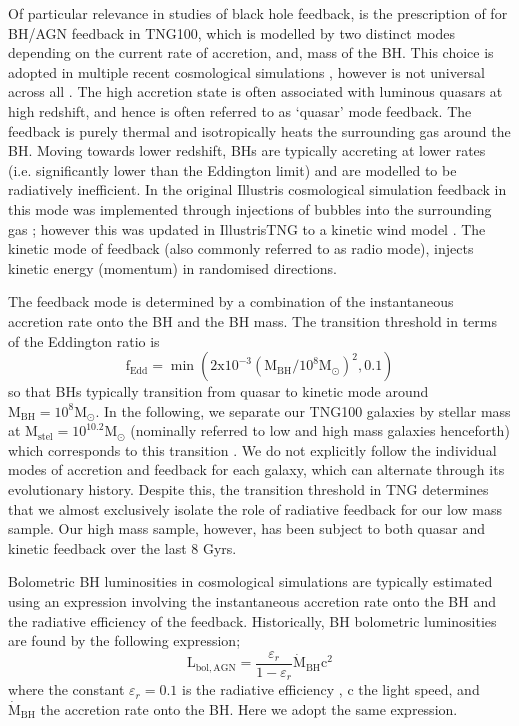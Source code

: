 Of particular relevance in studies of black hole feedback, is the prescription of \citet{weinberger17} for BH/AGN feedback in TNG100, which is modelled by two distinct modes depending on the current rate of accretion, and, mass of the BH. This choice is adopted in multiple recent cosmological simulations \citep[][]{sijacki2007, dubois2014}, however is not universal across all \citep[e.g.][]{schaye2015}. The high accretion state is often associated with luminous quasars at high redshift, and hence is often referred to as `quasar' mode feedback. The feedback is purely thermal and isotropically heats the surrounding gas around the BH. Moving towards lower redshift, BHs are typically accreting at lower rates (i.e. significantly lower than the Eddington limit) and are modelled to be radiatively inefficient. In the original Illustris cosmological simulation feedback in this mode was implemented through injections of bubbles into the surrounding gas \citep{sijacki2007}; however this was updated in IllustrisTNG to a kinetic wind model \citep{weinberger17}. The kinetic mode of feedback (also commonly referred to as radio mode), injects kinetic energy (momentum) in randomised directions. 

The feedback mode is determined by a combination of the instantaneous accretion rate onto the BH and the BH mass. The transition threshold in terms of the Eddington ratio is 
\begin{equation}
\mathrm{f_{Edd}= \min ( 2x10^{-3}(M_{BH}/10^8 M_{\odot})^2 , 0.1)}
\end{equation}
so that BHs typically transition from quasar to kinetic mode around $\mathrm{M_{BH} = 10^{8}M_{\odot}}$. In the following, we separate our TNG100 galaxies by stellar mass at $\mathrm{M_{stel} = 10^{10.2}M_{\odot}}$ (nominally referred to low and high mass galaxies henceforth) which corresponds to this transition \citep[i.e. $\mathrm{M_{BH} \approx 10^{8}M_{\odot}}$, see Fig 1 in][]{li2019}. We do not explicitly follow the individual modes of accretion and feedback for each galaxy, which can alternate through its evolutionary history. Despite this, the transition threshold in TNG determines that we almost exclusively isolate the role of radiative feedback for our low mass sample. Our high mass sample, however, has been subject to both quasar and kinetic feedback over the last 8 Gyrs. 

Bolometric BH luminosities in cosmological simulations are typically estimated using an expression involving the instantaneous accretion rate onto the BH and the radiative efficiency of the feedback. Historically, BH bolometric luminosities are found by the following expression;
\begin{equation}
\mathrm{L_{bol, AGN}} = \frac{\varepsilon_r}{1 - \varepsilon_r} \dot{\mathrm{M}}_{\mathrm{BH}} \mathrm{c^2}
\end{equation}
where the constant $\varepsilon_r=0.1$ is the radiative efficiency \citep[see discussion in][]{habouzit2019}, c the light speed, and $\dot{\mathrm{M}}_{\mathrm{BH}}$ the accretion rate onto the BH. Here we adopt the same expression. 

